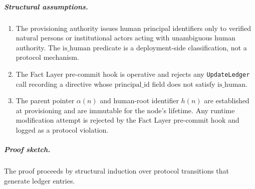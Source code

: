 \subparagraph{Structural assumptions.}
\begin{enumerate}
\item[\textbf{A3.1}] The provisioning authority issues human principal identifiers only to verified natural persons or institutional actors acting with unambiguous human authority. The $\text{is\_human}$ predicate is a deployment-side classification, not a protocol mechanism.
\item[\textbf{A3.2}] The Fact Layer pre-commit hook is operative and rejects any \texttt{UpdateLedger} call recording a directive whose $\text{principal\_id}$ field does not satisfy $\text{is\_human}$.
\item[\textbf{A3.3}] The parent pointer $\alpha(n)$ and human-root identifier $h(n)$ are established at provisioning and are immutable for the node's lifetime. Any runtime modification attempt is rejected by the Fact Layer pre-commit hook and logged as a protocol violation.
\end{enumerate}

\subparagraph{Proof sketch.} The proof proceeds by structural induction over protocol transitions that generate ledger entries.


